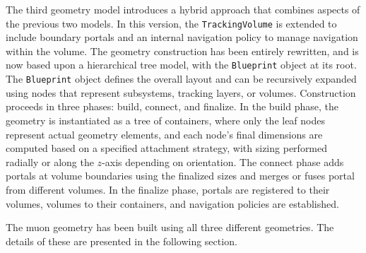 The third geometry model introduces a hybrid approach that combines aspects of the previous two models. In this version, the \texttt{TrackingVolume} is extended to include boundary portals and an internal navigation policy to manage navigation within the volume. The geometry construction has been entirely rewritten, and is now based upon a hierarchical tree model, with the \texttt{Blueprint} object at its root. The \texttt{Blueprint} object defines the overall layout and can be recursively expanded using nodes that represent subsystems, tracking layers, or volumes. Construction proceeds in three phases: build, connect, and finalize. In the build phase, the geometry is instantiated as a tree of containers, where only the leaf nodes represent actual geometry elements, and each node's final dimensions are computed based on a specified attachment strategy, with sizing performed radially or along the $z$-axis depending on orientation. The connect phase adds portals at volume boundaries using the finalized sizes and merges or fuses portal from different volumes. In the finalize phase, portals are registered to their volumes, volumes to their containers, and navigation policies are established.

The muon geometry has been built using all three different geometries. The details of these are presented in the following section.

